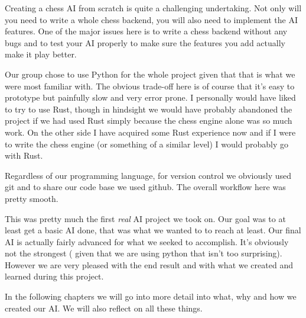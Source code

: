 Creating a chess AI from scratch is quite a challenging undertaking.
Not only will you need to write a whole chess backend, you will also
need to implement the AI features. One of the major issues here
is to write a chess backend without any bugs and to test your
AI properly to make sure the features you add actually make it
play better.

Our group chose to use Python for the whole project given
that that is what we were most familiar with.
The obvious trade-off here is of course that it's easy
to prototype but painfully slow and very error prone.
I personally would have liked to try to use Rust,
though in hindsight we would have probably abandoned
the project if we had used Rust simply because
the chess engine alone was so much work.
On the other side I have acquired some Rust experience
now and if I were to write the chess engine
(or something of a similar level) I would probably
go with Rust.

Regardless of our programming language, for version control
we obviously used git and to share our code base we used github.
The overall workflow here was pretty smooth.

This was pretty much the first \textit{real} AI project we
took on. Our goal was to at least get a basic AI done,
that was what we wanted to to reach at least.
Our final AI is actually fairly advanced for what we seeked
to accomplish. It's obviously not the strongest (
given that we are using python that isn't too surprising).
However we are very pleased with the end result and with what
we created and learned during this project.

In the following chapters we will go into more detail
into what, why and how we created our AI.
We will also reflect on all these things.
